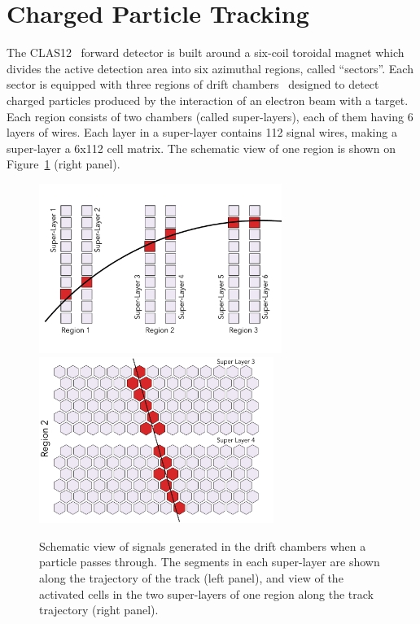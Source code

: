 \section{Charged Particle Tracking}

The CLAS12~\cite{Burkert:2020akg} forward detector is built around a six-coil toroidal magnet 
which divides the active detection area into six azimuthal regions, called ``sectors''. Each sector is 
equipped with three regions of drift chambers~\cite{Mestayer:2020saf} designed to detect charged 
particles produced by the interaction of an electron beam with a target. Each region consists of two 
chambers (called super-layers), each of them having 6 layers of wires. Each layer  in a super-layer 
contains 112 signal wires, making a super-layer a 6x112 cell matrix. The schematic view of one region 
is shown on Figure~\ref{dc:side_view} (right panel).

\begin{figure}[!ht]
\begin{center}
 \includegraphics[width=3.1in]{images/dc_diagram.pdf}
 \includegraphics[width=3in]{images/region_2_diagram.pdf}
\caption {Schematic view of signals generated in the drift chambers when a particle passes through. 
The segments in each super-layer are shown along the trajectory of the track (left panel), and view 
of the activated cells in the two super-layers of one region along the track trajectory (right panel).}
 \label{dc:side_view}
 \end{center}
\end{figure}

